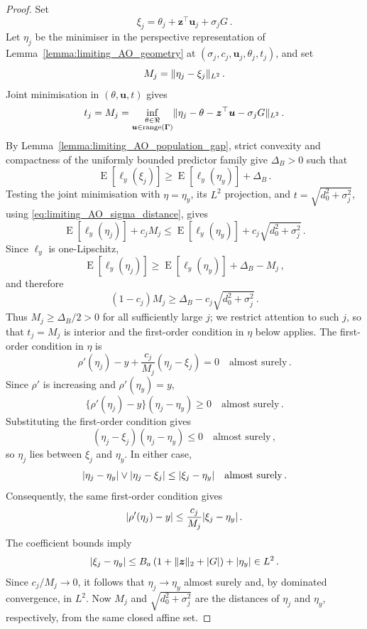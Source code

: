 \documentclass{article}
\makeatletter
\DeclareMathOperator{\expect}{E}
\theoremstyle{definition}
\newcommand{\vnorm}[1]{%
	\ensuremath{%
		\if@display
		\left\| #1 \right\|
		\else
		\| #1 \|
		\fi
	}%
}
\newcommand{\abs}[1]{%
	\ensuremath{%
		\if@display
		\left| #1 \right|
		\else
		\lvert #1 \rvert
		\fi
	}%
}
\newcommand*{\bb}{\boldsymbol}
\def\bu{\bb{u}}
\def\bz{\bb{z}}
\newcommand{\range}{\operatorname{range}}
\makeatother
\begin{document}
\begin{bibunit}
\begin{proof}
Set
$$
    \xi_j
    =
    \theta_j+\bz^\top\bu_j+\sigma_jG\,.
$$
Let $\eta_j$ be the minimiser in the perspective representation of
Lemma~\ref{lemma:limiting_AO_geometry} at
$(\sigma_j,c_j,\bu_j,\theta_j,t_j)$, and set
$$
    M_j
    =
    \vnorm{\eta_j-\xi_j}_{L^2}\,.
$$
Joint minimisation in $(\theta,\bu,t)$ gives
$$
    t_j
    =
    M_j
    =
    \underset{\substack{
        \theta\in\Re\\
        \bu\in\range(\bb\Gamma)
    }}{\inf}
    \vnorm{
        \eta_j-\theta-\bz^\top\bu-\sigma_jG
    }_{L^2}\,.
$$
By Lemma~\ref{lemma:limiting_AO_population_gap}, strict convexity and
compactness of the uniformly bounded predictor family give
$\Delta_B>0$ such that
$$
    \expect[\ell_y(\xi_j)]
    \geq
    \expect[\ell_y(\eta_y)]
    +
    \Delta_B\,.
$$
Testing the joint minimisation with $\eta=\eta_y$, its $L^2$ projection,
and $t=\sqrt{d_0^2+\sigma_j^2}$, using
\eqref{eq:limiting_AO_sigma_distance}, gives
$$
    \expect[\ell_y(\eta_j)]
    +
    c_jM_j
    \leq
    \expect[\ell_y(\eta_y)]
    +
    c_j\sqrt{d_0^2+\sigma_j^2}\,.
$$
Since $\ell_y$ is one-Lipschitz,
$$
    \expect[\ell_y(\eta_j)]
    \geq
    \expect[\ell_y(\eta_y)]
    +
    \Delta_B
    -
    M_j\,,
$$
and therefore
$$
    (1-c_j)M_j
    \geq
    \Delta_B
    -
    c_j\sqrt{d_0^2+\sigma_j^2}\,.
$$
Thus $M_j\geq\Delta_B/2>0$ for all sufficiently large $j$; we restrict attention to such $j$, so that $t_j=M_j$ is interior and the first-order condition in $\eta$ below applies.
The first-order condition in $\eta$ is
$$
    \rho'(\eta_j)-y
    +
    \frac{c_j}{M_j}
    (\eta_j-\xi_j)
    =
    0
    \quad\text{almost surely}\,.
$$
Since $\rho'$ is increasing and $\rho'(\eta_y)=y$,
$$
	\{\rho'(\eta_j)-y\}(\eta_j-\eta_y)
	\geq
	0
	\quad\text{almost surely}\,.
$$
Substituting the first-order condition gives
$$
	(\eta_j-\xi_j)(\eta_j-\eta_y)
	\leq
	0
	\quad\text{almost surely}\,,
$$
so $\eta_j$ lies between $\xi_j$ and $\eta_y$. In either case,
$$
	\abs{\eta_j-\eta_y}
	\vee
	\abs{\eta_j-\xi_j}
	\leq
	\abs{\xi_j-\eta_y}
	\quad\text{almost surely}\,.
$$
Consequently, the same first-order condition gives
$$
    \abs{\rho'(\eta_j)-y}
    \leq
    \frac{c_j}{M_j}
    \abs{\xi_j-\eta_y}\,.
$$
The coefficient bounds imply
$$
    \abs{\xi_j-\eta_y}
    \leq
    B_a
    \left(
        1+\vnorm{\bz}_2+\abs G
    \right)
    +
    \abs{\eta_y}
    \in
    L^2\,.
$$
Since $c_j/M_j\to0$, it follows that
$\eta_j\to\eta_y$ almost surely and, by dominated convergence, in $L^2$.
Now $M_j$ and $\sqrt{d_0^2+\sigma_j^2}$ are the distances of
$\eta_j$ and $\eta_y$, respectively, from the same closed affine set.

\end{proof}
\end{bibunit}
\end{document}
